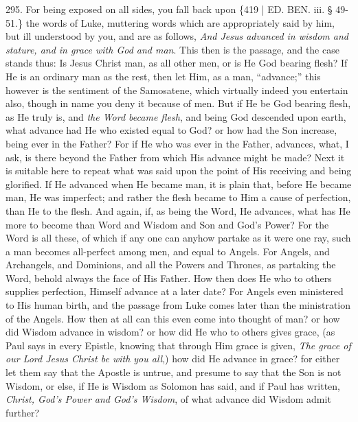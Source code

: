 295.
For being exposed on all sides, you fall back upon \{419 | ED.
BEN.
iii. § 49-51.\} the words of Luke, muttering words which are
appropriately said by him, but ill understood by you, and are as
follows, \emph{And Jesus advanced in wisdom and stature, and in grace
with God and man}. This then is the passage, and the case stands
thus: Is Jesus Christ man, as all other men, or is He God bearing
flesh? If He is an ordinary man as the rest, then let Him, as a man, ``advance;''
this however is the sentiment of the Samosatene, which virtually
indeed you entertain also, though in name you deny it because of men.
But if He be God bearing flesh, as He truly is, and \emph{the Word became
flesh}, and being God descended upon earth, what advance had He who
existed equal to God? or how had the Son increase, being ever in the
Father? For if He who was ever in the Father, advances, what, I ask,
is there beyond the Father from which His advance might be made? Next
it is suitable here to repeat what was said upon the point of His
receiving and being glorified. If He advanced when He became man, it
is plain that, before He became man, He was imperfect; and rather the
flesh became to Him a cause of perfection, than He to the flesh. And
again, if, as being the Word, He advances, what has He more to become
than Word and Wisdom and Son and God's Power? For the Word is all
these, of which if any one can anyhow partake as it were one ray, such
a man becomes all-perfect among men, and equal to Angels. For Angels,
and Archangels, and Dominions, and all the Powers and Thrones, as
partaking the Word, behold always the face of His Father. How then
does He who to others supplies perfection, Himself advance at a later
date? For Angels even ministered to His human birth, and the passage
from Luke comes later than the ministration of the Angels. How then at
all can this even come into thought of man? or how did Wisdom advance
in wisdom? or how did He who to others gives grace, (as Paul
says in every Epistle, knowing that through Him grace is given, \emph{The
grace of our Lord Jesus Christ be with you all},) how did He
advance in grace? for either let them say that the Apostle is untrue,
and presume to say that the Son is not Wisdom, or else, if He is
Wisdom as Solomon has said, and if Paul has written, \emph{Christ, God's
Power and God's Wisdom}, of what advance did Wisdom admit further?

